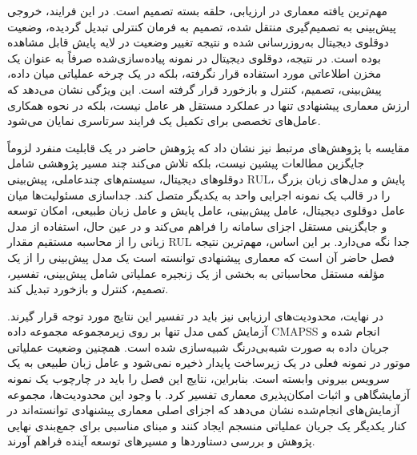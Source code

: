 \documentclass[a4paper,fleqn]{report}
\begin{document}
مهم‌ترین یافته معماری در ارزیابی، حلقه بسته تصمیم است. در این فرایند، خروجی پیش‌بینی به تصمیم‌گیری منتقل شده، تصمیم به فرمان کنترلی تبدیل گردیده، وضعیت دوقلوی دیجیتال به‌روزرسانی شده و نتیجه تغییر وضعیت در لایه پایش قابل مشاهده بوده است. در نتیجه، دوقلوی دیجیتال در نمونه پیاده‌سازی‌شده صرفاً به عنوان یک مخزن اطلاعاتی مورد استفاده قرار نگرفته، بلکه در یک چرخه عملیاتی میان داده، پیش‌بینی، تصمیم، کنترل و بازخورد قرار گرفته است. این ویژگی نشان می‌دهد که ارزش معماری پیشنهادی تنها در عملکرد مستقل هر عامل نیست، بلکه در نحوه همکاری عامل‌های تخصصی برای تکمیل یک فرایند سرتاسری نمایان می‌شود.

مقایسه با پژوهش‌های مرتبط نیز نشان داد که پژوهش حاضر در یک قابلیت منفرد لزوماً جایگزین مطالعات پیشین نیست، بلکه تلاش می‌کند چند مسیر پژوهشی شامل دوقلوهای دیجیتال، سیستم‌های چندعاملی، پیش‌بینی \gls{RUL}، پایش و مدل‌های زبان بزرگ را در قالب یک نمونه اجرایی واحد به یکدیگر متصل کند. جداسازی مسئولیت‌ها میان عامل دوقلوی دیجیتال، عامل پیش‌بینی، عامل پایش و عامل زبان طبیعی، امکان توسعه و جایگزینی مستقل اجزای سامانه را فراهم می‌کند و در عین حال، استفاده از مدل زبانی را از محاسبه مستقیم مقدار \gls{RUL} جدا نگه می‌دارد. بر این اساس، مهم‌ترین نتیجه فصل حاضر آن است که معماری پیشنهادی توانسته است یک مدل پیش‌بینی را از یک مؤلفه مستقل محاسباتی به بخشی از یک زنجیره عملیاتی شامل پیش‌بینی، تفسیر، تصمیم، کنترل و بازخورد تبدیل کند.

در نهایت، محدودیت‌های ارزیابی نیز باید در تفسیر این نتایج مورد توجه قرار گیرند. آزمایش کمی مدل تنها بر روی زیرمجموعه  مجموعه داده \gls{CMAPSS} انجام شده و جریان داده به صورت شبه‌بی‌درنگ شبیه‌سازی شده است. همچنین وضعیت عملیاتی موتور در نمونه فعلی در یک زیرساخت پایدار ذخیره نمی‌شود و عامل زبان طبیعی به یک سرویس بیرونی وابسته است. بنابراین، نتایج این فصل را باید در چارچوب یک نمونه آزمایشگاهی و اثبات امکان‌پذیری معماری تفسیر کرد. با وجود این محدودیت‌ها، مجموعه آزمایش‌های انجام‌شده نشان می‌دهد که اجزای اصلی معماری پیشنهادی توانسته‌اند در کنار یکدیگر یک جریان عملیاتی منسجم ایجاد کنند و مبنای مناسبی برای جمع‌بندی نهایی پژوهش و بررسی دستاوردها و مسیرهای توسعه آینده فراهم آورند.





\end{document}
